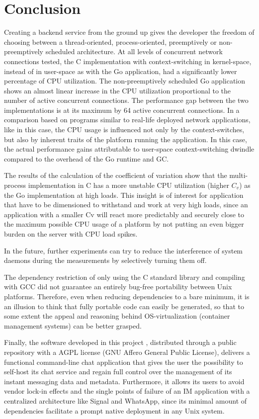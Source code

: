 \section{Conclusion}
Creating a backend service from the ground up gives the developer the freedom of choosing between a thread-oriented, process-oriented, preemptively or non-preemptively scheduled architecture. At all levels of concurrent network connections tested, the C implementation with context-switching in kernel-space, instead of in user-space as with the Go application, had a significantly lower percentage of CPU utilization. The non-preemptively scheduled Go application shows an almost linear increase in the CPU utilization proportional to the number of active concurrent connections. The performance gap between the two implementations is at its maximum by 64 active concurrent connections. In a comparison based on programs similar to real-life deployed network applications, like in this case, the CPU usage is influenced not only by the context-switches, but also by inherent traits of the platform running the application. In this case, the actual performance gains attributable to user-space context-switching dwindle compared to the overhead of the Go runtime and GC.

The results of the calculation of the coefficient of variation show that the multi-process implementation in C has a more unstable CPU utilization (higher $C_v$) as the Go implementation at high loads. This insight is of interest for application that have to be dimensioned to withstand and work at very high loads, since an application with a smaller Cv will react more predictably and securely close to the maximum possible CPU usage of a platform by not putting an even bigger burden on the server with CPU load spikes.

In the future, further experiments can try to reduce the interference of system daemons during the measurements by selectively turning them off.

The dependency restriction of only using the C standard library and compiling with GCC did not guarantee an entirely bug-free portability between Unix platforms. Therefore, even when reducing dependencies to a bare minimum, it is an illusion to think that fully portable code can easily be generated, so that to some extent the appeal and reasoning behind OS-virtualization (container management systems) can be better grasped.

Finally, the software developed in this project \cite{Rodriguez2022}, distributed through a public repository with a AGPL license (GNU Affero General Public License), delivers a functional command-line chat application that gives the user the possibility to self-host its chat service and regain full control over the management of its instant messaging data and metadata. Furthermore, it allows its users to avoid vendor lock-in effects and the single points of failure of an IM application with a centralized architecture like Signal and WhatsApp, since its minimal amount of dependencies facilitate a prompt native deployment in any Unix system.